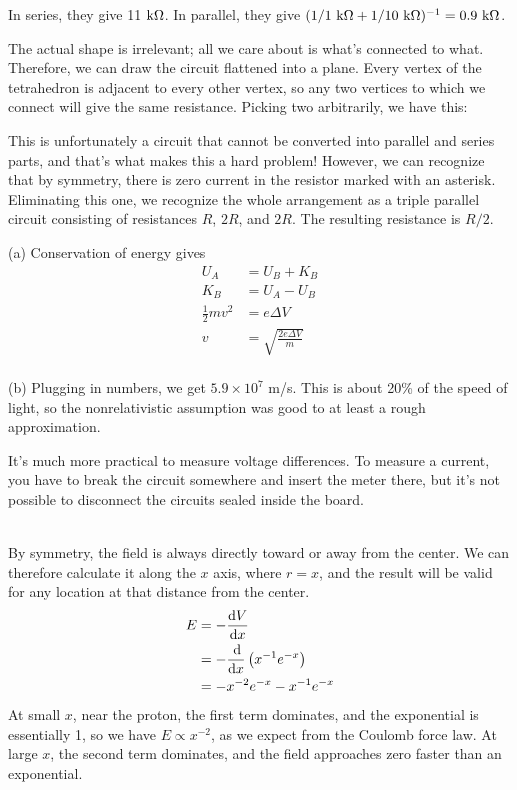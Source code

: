  

In series, they give 11 $\textup{k}\Omega$. 
In parallel, they give $(1/1\ \zu{k}\Omega+1/10\ \zu{k}\Omega)^{-1} = 0.9\ \zu{k}\Omega$.

The actual shape is irrelevant; all we care about is what's connected to
what. Therefore, we can draw the circuit flattened into a plane. Every
vertex of the tetrahedron is adjacent to every other vertex, so any two
vertices to which we connect will give the same resistance. Picking two
arbitrarily, we have this:


This is unfortunately a circuit that cannot be converted into parallel
and series parts, and that's what makes this a hard problem! However, we
can recognize that by symmetry, there is zero current in the resistor
marked with an asterisk. Eliminating this one, we recognize the whole
arrangement as a triple parallel circuit consisting of resistances $R$,
$2R$, and $2R$. The resulting resistance is $R/2$.

(a) Conservation of energy gives
\begin{align*}
	U_A		&= U_B+K_B\\
	K_B		&= U_A-U_B\\
	\frac{1}{2}mv^2 &= e\Delta V\\
	v &= \sqrt{\frac{2e\Delta V}{m}}
\end{align*}\\
(b) Plugging in numbers, we get $5.9\times10^7$ m/s. This is about
20\% of the speed of light, so the nonrelativistic assumption
was good to at least a rough approximation.

 It's much more practical to measure voltage differences.
To measure a current, you have to break the circuit
somewhere and insert the meter there, but it's not possible
to disconnect the circuits sealed inside the board.

\noindent{}\\
By symmetry, the field is always directly toward or away from the center.
We can therefore calculate it along the $x$ axis, where $r=x$, and the
result will be valid for any location at that distance from the center.
\begin{align*}
	E	&= -\frac{\operatorname{d\!} V}{\operatorname{d\!} x} \\
		&= -\frac{\operatorname{d\!}}{\operatorname{d\!} x}\left(x^{-1}e^{-x}\right) \\
		&= -x^{-2}e^{-x}-x^{-1}e^{-x} \\
\end{align*}
At small $x$, near the proton, the first term dominates, and the exponential
is essentially 1, so we have $E\propto x^{-2}$, as we expect from the Coulomb
force law. At large $x$, the second term dominates, and
the field approaches zero faster than an exponential.

